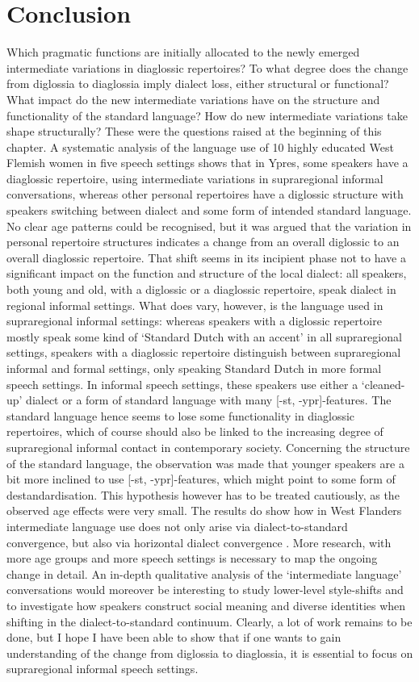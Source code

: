 \documentclass[output=paper]{LSP/langsci}
\begin{document}
\section{Conclusion}

Which pragmatic functions are initially allocated to the newly emerged intermediate variations in diaglossic repertoires? To what degree does the change from diglossia to diaglossia imply dialect loss, either structural or functional? What impact do the new intermediate variations have on the structure and functionality of the standard language? How do new intermediate variations take shape structurally? These were the questions raised at the beginning of this chapter. A systematic analysis of the language use of 10 highly educated West Flemish women in five speech settings shows that in Ypres, some speakers have a diaglossic repertoire, using intermediate variations in supraregional informal conversations, whereas other personal repertoires have a diglossic structure with speakers switching between dialect and some form of intended standard language. No clear age patterns could be recognised, but it was argued that the variation in personal repertoire structures indicates a change from an overall diglossic to an overall diaglossic repertoire. That shift seems in its incipient phase not to have a significant impact on the function and structure of the local dialect: all speakers, both young and old, with a diglossic or a diaglossic repertoire, speak dialect in regional informal settings. What does vary, however, is the language used in supraregional informal settings: whereas speakers with a diglossic repertoire mostly speak some kind of ‘Standard Dutch with an accent’ in all supraregional settings, speakers with a diaglossic repertoire distinguish between supraregional informal and formal settings, only speaking Standard Dutch in more formal speech settings. In informal speech settings, these speakers use either a ‘cleaned-up’ dialect or a form of standard language with many [-st, -ypr]-features. The standard language hence seems to lose some functionality in diaglossic repertoires, which of course should also be linked to the increasing degree of supraregional informal contact in contemporary society. Concerning the structure of the standard language, the observation was made that younger speakers are a bit more inclined to use [-st, -ypr]-features, which might point to some form of destandardisation. This hypothesis however has to be treated cautiously, as the observed age effects were very small. The results do show how in West Flanders intermediate language use does not only arise via dialect-to-standard convergence, but also via horizontal dialect convergence \citep{auer_convergence_1996}. More research, with more age groups and more speech settings is necessary to map the ongoing change in detail. An in-depth qualitative analysis of the ‘intermediate language’ conversations would moreover be interesting to study lower-level style-shifts and to investigate how speakers construct social meaning and diverse identities when shifting in the dialect-to-standard continuum. Clearly, a lot of work remains to be done, but I hope I have been able to show that if one wants to gain understanding of the change from diglossia to diaglossia, it is essential to focus on supraregional informal speech settings. 

\printbibliography[heading=subbibliography,notkeyword=this]
\end{document}
